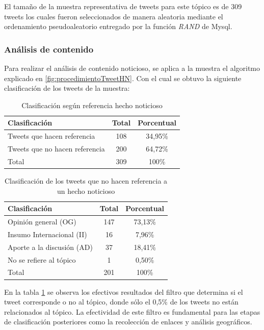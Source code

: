 El tamaño de la muestra representativa de tweets para este tópico es de 309 tweets los cuales fueron seleccionados de manera aleatoria mediante el ordenamiento pseudoaleatorio entregado por la función \emph{RAND} de Mysql.

\subsubsection{Análisis de contenido}

Para realizar el análisis de contenido noticioso, se aplica a la muestra el algoritmo explicado en \ref{fig:procedimientoTweetHN}. Con el cual se obtuvo la siguiente clasificación de los tweets de la muestra:

\begin{table}[H]
	\centering
	\begin{tabular}{| l | c | c |}
		\hline
		Clasificación    & Total & Porcentual\\ \hline
		Tweets que hacen referencia    & 108 & 34,95\%\\ \hline
		Tweets que no hacen referencia & 200 & 64,72\%\\ \hline
		Total    & 309 & 100\% \\
		\hline
	\end{tabular}
	\caption {Clasificación según referencia hecho noticioso}
\end{table}

\begin{table}[H]
	\centering
	\begin{tabular}{| l | c | c |}
		\hline
		Clasificación    & Total & Porcentual\\ \hline
		Opinión general (OG)  & 147 & 73,13\% \\ \hline
		Insumo Internacional (II) & 16 & 7,96\% \\ \hline
		Aporte a la discusión (AD) & 37 & 18,41\%\\ \hline
		No se refiere al tópico & 1 & 0,50\% \\ \hline
		Total & 201 & 100\% \\
		\hline
	\end{tabular}
	\caption {Clasificación de los tweets que no hacen referencia a un hecho noticioso}
	\label{clasifTweetsNoHechoNoticioso}
\end{table}

En la tabla \ref{clasifTweetsNoHechoNoticioso} se observa los efectivos resultados del filtro que determina si el tweet corresponde o no al tópico, donde sólo el 0,5\% de los tweets no están relacionados al tópico. La efectividad de este filtro  es fundamental para las etapas de clasificación posteriores como la recolección de enlaces y análisis geográficos. 

